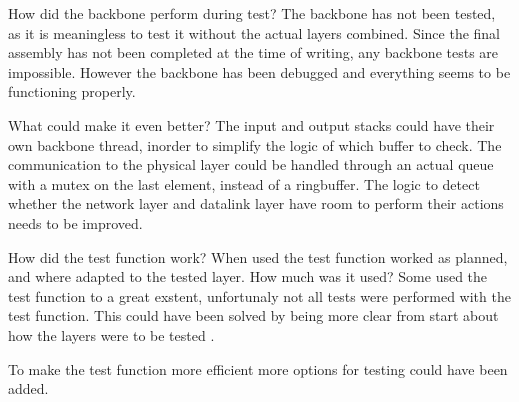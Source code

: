 How did the backbone perform during test?
The backbone has not been tested, as it is meaningless to test it without the actual layers combined. Since the final assembly has not been completed at the time of writing, any backbone tests are impossible. However the backbone has been debugged and everything seems to be functioning properly.

What could make it even better?
The input and output stacks could have their own backbone thread, inorder to simplify the logic of which buffer to check.
The communication to the physical layer could be handled through an actual queue with a mutex on the last element, instead of a ringbuffer. The logic to detect whether the network layer and datalink layer have room to perform their actions needs to be improved.


How did the test function work?
When used the test function worked as planned, and where adapted to the tested layer. 
How much was it used?
Some used the test function to a great exstent, unfortunaly not all tests were performed with the test function. This could have been solved by being more clear from start about how the layers were to be tested . 

To make the test function more efficient more options for testing could have been added.
